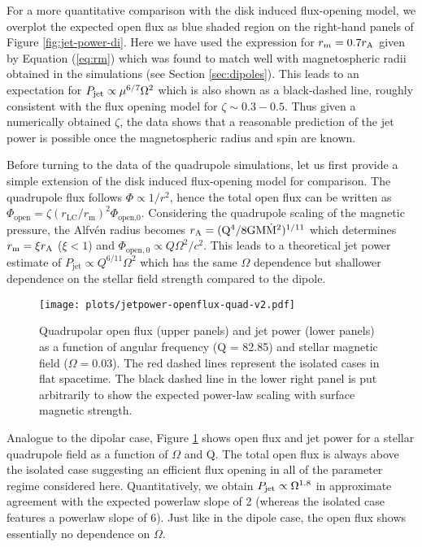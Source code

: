 \documentclass[fleqn,usenatbib]{mnras}
\begin{document}
For a more quantitative comparison with the disk induced flux-opening model, we overplot the expected open flux as blue shaded region on the right-hand panels of Figure \ref{fig:jet-power-di}.  
Here we have used the expression for $r_m=0.7 r_{\rm A}$ given by Equation (\ref{eq:rm}) which was found to match well with magnetospheric radii obtained in the simulations (see Section \ref{sec:dipoles}).  This leads to an expectation for $P_{\rm jet} \propto \mu^{6/7} \Omega^2$ which is also shown as a black-dashed line, roughly consistent with the flux opening model for $\zeta \sim 0.3-0.5$.  
Thus given a numerically obtained $\zeta$, the data shows that a reasonable prediction of the jet power is possible once the magnetospheric radius and spin are known.  

Before turning to the data of the quadrupole simulations, let us first provide a simple extension of the disk induced flux-opening model for comparison.  The quadrupole flux follows $\Phi \propto 1/r^2$, hence the total open flux can be written as $\Phi_{\text{open}} = \zeta (r_{\text{LC}}/r_{\text{m}})^2 \Phi_{\text{open,0}}$. Considering the quadrupole scaling of the magnetic pressure, the Alfv\'en radius becomes $r_{\rm A} = ({\rm Q^4/8GM}\dot{\rm M}^2)^{1/11}$ which determines $r_{\rm m} =\xi r_{\rm A}$ ($\xi < 1$) and $\Phi_{\text{open},0} \propto Q\Omega^2/c^2$. This leads to a theoretical jet power estimate of $P_{\text{jet}} \propto Q^{6/11}\Omega^2$ which has the same $\Omega$ dependence but shallower dependence on the stellar field strength compared to the dipole.

\begin{figure}
 \centering
 \texttt{[image: plots/jetpower-openflux-quad-v2.pdf]}
  \caption{Quadrupolar open flux (upper panels) and jet power (lower panels) as a function of angular frequency (Q = 82.85) and stellar magnetic field ($\Omega = 0.03$). The red dashed lines represent the isolated cases in flat spacetime. The black dashed line in the lower right panel is put arbitrarily to show the expected power-law scaling with surface magnetic strength.} %
\label{fig:jet-power-quad}
\end{figure}
Analogue to the dipolar case, Figure \ref{fig:jet-power-quad} shows open flux and jet power for a stellar quadrupole field as a function of $\Omega$ and Q. The total open flux is always above the isolated case suggesting an efficient flux opening in all of the parameter regime considered here. Quantitatively, we obtain $P_{\rm jet} \propto \Omega^{1.8}$ in approximate agreement with the expected powerlaw slope of 2 (whereas the isolated case features a powerlaw slope of $6$).  Just like in the dipole case, the open flux shows essentially no dependence on $\Omega$.
\end{document}
